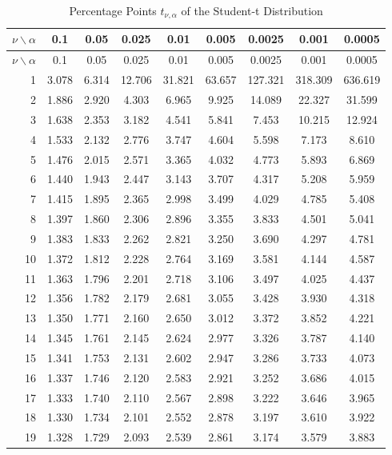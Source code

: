 \documentclass[
]{book}
\theoremstyle{definition}
\theoremstyle{definition}
\theoremstyle{definition}
\theoremstyle{definition}
\theoremstyle{remark}
\begin{document}
\hypertarget{appB:tab:tdist}{}
\begin{longtable}[]{@{}rcccccccc@{}}
\caption{Percentage Points \(t_{\nu,\alpha}\) of the Student-t Distribution}\tabularnewline
\toprule
\(\nu \backslash \alpha\) & 0.1 & 0.05 & 0.025 & 0.01 & 0.005 & 0.0025 & 0.001 & 0.0005 \\
\midrule
\endfirsthead
\toprule
\(\nu \backslash \alpha\) & 0.1 & 0.05 & 0.025 & 0.01 & 0.005 & 0.0025 & 0.001 & 0.0005 \\
\midrule
\endhead
1 & 3.078 & 6.314 & 12.706 & 31.821 & 63.657 & 127.321 & 318.309 & 636.619 \\
2 & 1.886 & 2.920 & 4.303 & 6.965 & 9.925 & 14.089 & 22.327 & 31.599 \\
3 & 1.638 & 2.353 & 3.182 & 4.541 & 5.841 & 7.453 & 10.215 & 12.924 \\
4 & 1.533 & 2.132 & 2.776 & 3.747 & 4.604 & 5.598 & 7.173 & 8.610 \\
5 & 1.476 & 2.015 & 2.571 & 3.365 & 4.032 & 4.773 & 5.893 & 6.869 \\
6 & 1.440 & 1.943 & 2.447 & 3.143 & 3.707 & 4.317 & 5.208 & 5.959 \\
7 & 1.415 & 1.895 & 2.365 & 2.998 & 3.499 & 4.029 & 4.785 & 5.408 \\
8 & 1.397 & 1.860 & 2.306 & 2.896 & 3.355 & 3.833 & 4.501 & 5.041 \\
9 & 1.383 & 1.833 & 2.262 & 2.821 & 3.250 & 3.690 & 4.297 & 4.781 \\
10 & 1.372 & 1.812 & 2.228 & 2.764 & 3.169 & 3.581 & 4.144 & 4.587 \\
11 & 1.363 & 1.796 & 2.201 & 2.718 & 3.106 & 3.497 & 4.025 & 4.437 \\
12 & 1.356 & 1.782 & 2.179 & 2.681 & 3.055 & 3.428 & 3.930 & 4.318 \\
13 & 1.350 & 1.771 & 2.160 & 2.650 & 3.012 & 3.372 & 3.852 & 4.221 \\
14 & 1.345 & 1.761 & 2.145 & 2.624 & 2.977 & 3.326 & 3.787 & 4.140 \\
15 & 1.341 & 1.753 & 2.131 & 2.602 & 2.947 & 3.286 & 3.733 & 4.073 \\
16 & 1.337 & 1.746 & 2.120 & 2.583 & 2.921 & 3.252 & 3.686 & 4.015 \\
17 & 1.333 & 1.740 & 2.110 & 2.567 & 2.898 & 3.222 & 3.646 & 3.965 \\
18 & 1.330 & 1.734 & 2.101 & 2.552 & 2.878 & 3.197 & 3.610 & 3.922 \\
19 & 1.328 & 1.729 & 2.093 & 2.539 & 2.861 & 3.174 & 3.579 & 3.883 \\

\end{longtable}
\end{document}
